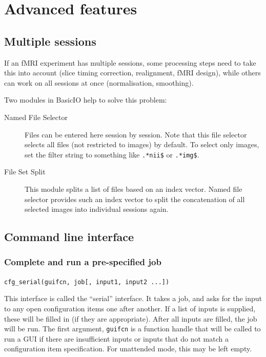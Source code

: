 \documentclass[a4paper]{book}
\begin{document}
\section{Advanced features}
\label{sec:batch_interface_advanced}

\subsection{Multiple sessions}

If an fMRI experiment has multiple sessions, some processing steps need to
take this into account (slice timing correction, realignment, fMRI design),
while others can work on all sessions at once (normalisation, smoothing). 

Two modules in BasicIO help to solve this problem:
\begin{description}
\item[Named File Selector] Files can be entered here session by session. Note
  that this file selector selects all files (not restricted to images) by
  default. To select only images, set the filter string to something like
  \verb|.*nii$| or \verb|.*img$|.
\item[File Set Split] This module splits a list of files based on an index
  vector. Named file selector provides such an index vector to split the
  concatenation of all selected images into individual sessions again.
\end{description}

\subsection{Command line interface}
\label{sec:batch_interface_cmd}


\subsubsection{Complete and run a pre-specified job}
\label{sec:batch_interface_cmd_cfg_serial}

\verb|cfg_serial(guifcn, job[, input1, input2 ...])|

This interface is called the ``serial'' interface. It takes a job, and asks
for the input to any open configuration items one after another. If a list of
inputs is supplied, these will be filled in (if they are appropriate). After
all inputs are filled, the job will be run. The first argument, \verb|guifcn|
is a function handle that will be called to run a GUI if there are
insufficient inputs or inputs that do not match a configuration item
specification. For unattended mode, this may be left empty.
\end{document}
